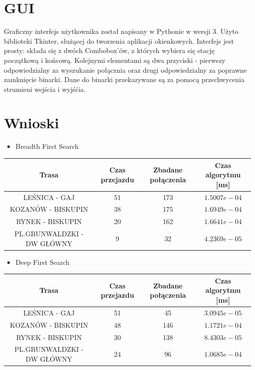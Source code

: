 \documentclass[13pt]{article}
\begin{document}
\section{GUI }

Graficzny interfejs użytkownika został napisany w Pythonie w wersji 3.
Użyto biblioteki Tkinter, służącej do tworzenia aplikacji okienkowych.
Interfejs jest prosty: składa się z dwóch Combobox'ów, z których wybiera się stację początkową i końcową. Kolejnymi elementami są dwa przyciski - pierwszy odpowiedzialny za wyszukanie połącznia oraz drugi odpowiedzialny za poprawne zamknięcie binarki. Dane do binarki przekazywane są za pomocą przechwycenia strumieni wejścia i wyjśćia.

\newpage

\section{Wnioski}

\begin{itemize}
\item Breadth First Search
\end{itemize}
\begin{tabular}{|c|c|c|c|} \hline
Trasa & Czas przejazdu  & Zbadane połączenia & Czas algorytmu [ms]\\
\hline \hline
 LEŚNICA - GAJ & 51 & 173 & $1.5007e-04$ \\
 \hline
 KOZANÓW - BISKUPIN & 38 & 175 &  $1.6949e-04$ \\
 \hline
 RYNEK - BISKUPIN & 20 & 162 & $1.6641e-04$ \\
 \hline
 PL.GRUNWALDZKI - DW GŁÓWNY & 9 & 32 &  $4.2369e-05$\\
 \hline
\end{tabular}

\begin{itemize}
\item Deep First Search
\end{itemize}
\begin{tabular}{|c|c|c|c|} \hline
Trasa & Czas przejazdu  & Zbadane połączenia & Czas algorytmu [ms]\\
\hline \hline
 LEŚNICA - GAJ & 51 & 45 &  $3.0945e-05$ \\
 \hline
 KOZANÓW - BISKUPIN & 48 & 146 &  $1.1721e-04$ \\
 \hline
 RYNEK - BISKUPIN & 30 & 138 & $8.4303e-05$ \\
 \hline
 PL.GRUNWALDZKI - DW GŁÓWNY & 24 & 96 &   $1.0685e-04$\\
 \hline
\end{tabular}
\end{document}
